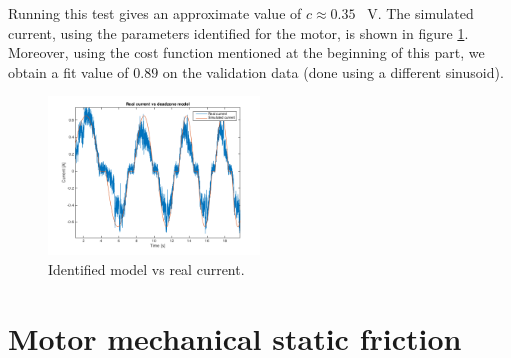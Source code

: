 Running this test gives an approximate value of $c \approx 0.35$ \SI{}{\volt}. The simulated current, using the parameters identified for the motor, is shown in figure \ref{fig:deadzone_sim}. Moreover, using the cost function  mentioned at the beginning of this part, we obtain a fit value of $0.89$ on the validation data (done using a different sinusoid).
  \begin{figure}[!h]
  \centering
  \includegraphics[width=0.5\textwidth]{img/deadzone3.png}
  \caption{Identified model vs real current.}
    \label{fig:deadzone_sim}
\end{figure}
\section{Motor mechanical static friction}

